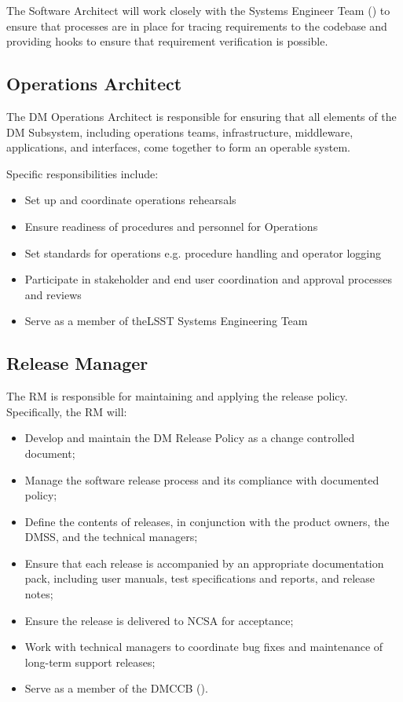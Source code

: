 The Software Architect will work closely with the Systems Engineer Team () to ensure that processes are in place for tracing requirements to the codebase and providing hooks to ensure that requirement verification is possible.

\subsection{Operations Architect \label{role:opsarc}}

The DM \gls{Operations} Architect is responsible for ensuring that all elements of the DM Subsystem, including operations teams, infrastructure, middleware, applications, and interfaces,
come together to form an operable system.

Specific responsibilities include:

\begin{itemize}
\item Set up and coordinate operations rehearsals
\item Ensure readiness of procedures and personnel for \gls{Operations}
\item Set standards for operations e.g. procedure handling and operator logging
\item Participate in stakeholder and end user coordination and approval processes and reviews
\item Serve as a member of theLSST \gls{Systems Engineering} Team
\end{itemize}

\subsection{Release Manager}\label{role:dmrm}

The \gls{RM} is responsible for maintaining and applying the release policy.
Specifically, the \gls{RM} will:

\begin{itemize}

  \item{Develop and maintain the DM \gls{Release} Policy as a change controlled
  document;}
  \item{Manage the software release process and its compliance with documented
  policy;}
  \item{Define the contents of releases, in conjunction with the product
  owners, the \gls{DMSS}, and the technical managers;}
  \item{Ensure that each release is accompanied by an appropriate
  documentation pack, including user manuals, test specifications and reports,
  and release notes;}
  \item{Ensure the release is delivered to \gls{NCSA} for acceptance;}
  \item{Work with technical managers to coordinate bug fixes and maintenance
  of long-term support releases;}
  \item{Serve as a member of the \gls{DMCCB} ().}

\end{itemize}

